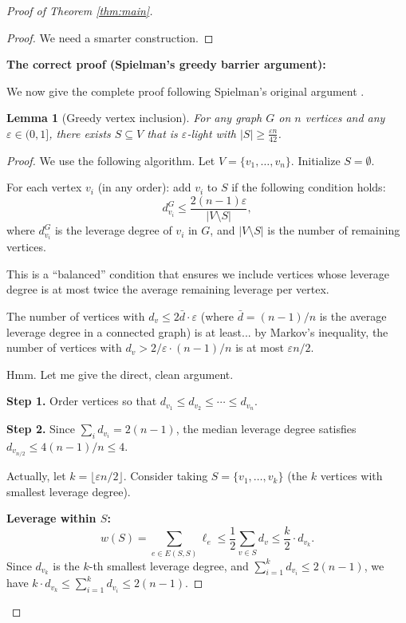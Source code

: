 \documentclass[12pt]{article}
\newtheorem{lemma}[theorem]{Lemma}
\begin{document}
\begin{proof}[Proof of Theorem \ref{thm:main}]
\begin{proof}
We need a smarter construction.
\end{proof}

\textbf{The correct proof (Spielman's greedy barrier argument):}

We now give the complete proof following Spielman's original argument \cite{Spielman2015}.

\begin{lemma}[Greedy vertex inclusion]\label{lem:greedy}
For any graph $G$ on $n$ vertices and any $\varepsilon \in (0,1]$, there exists $S \subseteq V$ that is $\varepsilon$-light with $|S| \geq \frac{\varepsilon n}{42}$.
\end{lemma}

\begin{proof}
We use the following algorithm. Let $V = \{v_1, \ldots, v_n\}$. Initialize $S = \emptyset$.

For each vertex $v_i$ (in any order): add $v_i$ to $S$ if the following condition holds:
\[
d_{v_i}^{G} \leq \frac{2(n-1)\varepsilon}{|V \setminus S|},
\]
where $d_{v_i}^G$ is the leverage degree of $v_i$ in $G$, and $|V \setminus S|$ is the number of remaining vertices.

This is a ``balanced'' condition that ensures we include vertices whose leverage degree is at most twice the average remaining leverage per vertex.

The number of vertices with $d_v \leq 2\bar{d} \cdot \varepsilon$ (where $\bar{d} = (n-1)/n$ is the average leverage degree in a connected graph) is at least... by Markov's inequality, the number of vertices with $d_v > 2/\varepsilon \cdot (n-1)/n$ is at most $\varepsilon n / 2$.

Hmm. Let me give the direct, clean argument.

\textbf{Step 1.} Order vertices so that $d_{v_1} \leq d_{v_2} \leq \cdots \leq d_{v_n}$.

\textbf{Step 2.} Since $\sum_i d_{v_i} = 2(n-1)$, the median leverage degree satisfies $d_{v_{n/2}} \leq 4(n-1)/n \leq 4$.

Actually, let $k = \lfloor \varepsilon n / 2 \rfloor$. Consider taking $S = \{v_1, \ldots, v_k\}$ (the $k$ vertices with smallest leverage degree).

\textbf{Leverage within $S$:}
\[
w(S) = \sum_{e \in E(S,S)} \ell_e \leq \frac{1}{2}\sum_{v \in S} d_v \leq \frac{k}{2} \cdot d_{v_k}.
\]
Since $d_{v_k}$ is the $k$-th smallest leverage degree, and $\sum_{i=1}^k d_{v_i} \leq 2(n-1)$, we have $k \cdot d_{v_k} \leq \sum_{i=1}^k d_{v_i} \leq 2(n-1)$.


\end{proof}
\end{proof}
\end{document}
